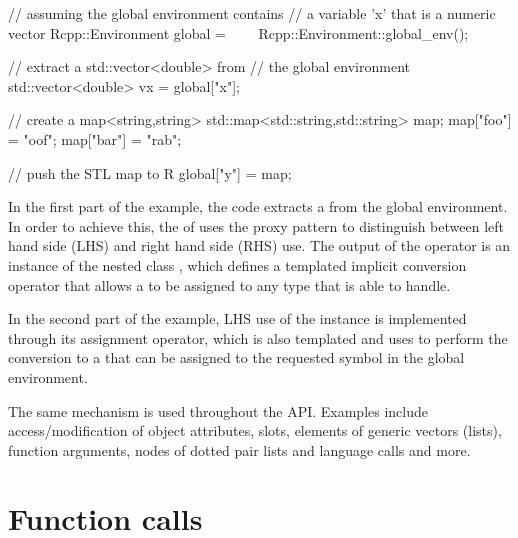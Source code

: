 \begin{example}
// assuming the global environment contains 
// a variable 'x' that is a numeric vector
Rcpp::Environment global = 
\ \ \ \ Rcpp::Environment::global_env();

// extract a std::vector<double> from 
// the global environment
std::vector<double> vx = global["x"];

// create a map<string,string>
std::map<std::string,std::string> map;
map["foo"] = "oof";
map["bar"] = "rab";

// push the STL map to R
global["y"] = map;
\end{example}

In the first part of the example, the code extracts a 
 from the global environment. In order to achieve this, 
the   of  uses the proxy pattern to distinguish 
between left hand side (LHS) and right hand side (RHS) use. 
The output of the operator is an instance of the nested class
, which defines a templated implicit conversion 
operator that allows a  to be assigned to any type that 
 is able to handle. 

In the second part of the example, LHS use of the  instance is 
implemented through its assignment operator, which is also templated and uses
 to perform the conversion to a  that can be 
assigned to the requested symbol in the global environment. 

The same mechanism is used throughout the API. Examples include access/modification
of object attributes, slots, elements of generic vectors (lists), 
function arguments, nodes of dotted pair lists and language calls and more. 

\section{Function calls}

